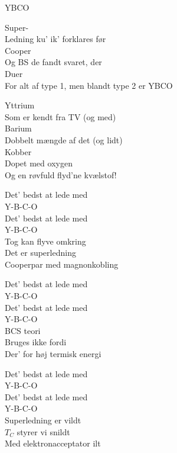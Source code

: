 \begin{song}{YBCO}
  \begin{SBVerse}
    Super-\\
    Ledning ku' ik' forklares før\\
    Cooper\\
    Og BS de fandt svaret, der\\
    Duer\\
    For alt af type 1, men blandt type 2 er YBCO
  \end{SBVerse}

  \begin{SBVerse}
    Yttrium\\
    Som er kendt fra TV (og med)\\
    Barium\\
    Dobbelt mængde af det (og lidt)\\
    Kobber\\
    Dopet med oxygen\\
    Og en røvfuld flyd'ne kvælstof!
  \end{SBVerse}

  \begin{SBChorus}
    Det' bedst at lede med\\
    Y-B-C-O\\
    Det' bedst at lede med\\
    Y-B-C-O\\
    Tog kan flyve omkring\\
    Det er superledning\\
    Cooperpar med magnonkobling
  \end{SBChorus}

  \begin{SBChorus}
    Det' bedst at lede med\\
    Y-B-C-O\\
    Det' bedst at lede med\\
    Y-B-C-O\\
    BCS teori\\
    Bruges ikke fordi\\
    Der' for høj termisk energi
  \end{SBChorus}

  \begin{SBChorus}
    Det' bedst at lede med\\
    Y-B-C-O\\
    Det' bedst at lede med\\
    Y-B-C-O\\
    Superledning er vildt\\
    $T_C$ styrer vi snildt\\
    Med elektronacceptator ilt
  \end{SBChorus}
\end{song}
